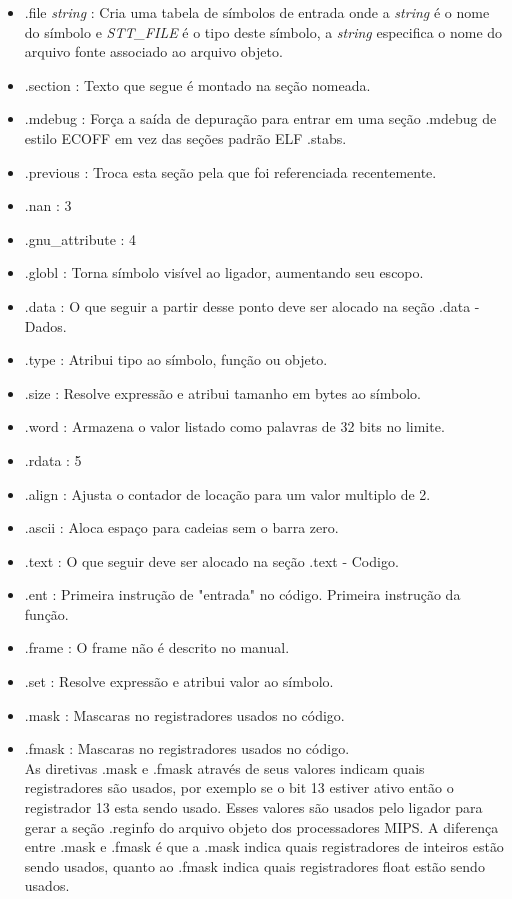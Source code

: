 \documentclass[12pt]{article}
\begin{document}
\begin{itemize}
\item .file \textit{string} : Cria uma tabela de símbolos de entrada onde a \textit{string} é o nome do símbolo e \textit{STT_FILE} é o tipo deste símbolo, a \textit{string} especifica o nome do arquivo fonte associado ao arquivo objeto.
\item .section : Texto que segue é montado na seção nomeada. 
\item .mdebug : Força a saída de depuração para entrar em uma seção .mdebug de estilo ECOFF em vez das seções padrão ELF .stabs.
\item .previous : Troca esta seção pela que foi referenciada recentemente.
\item .nan : 3
\item .gnu\_attribute : 4
\item .globl : Torna símbolo visível ao ligador, aumentando seu escopo.
\item .data : O que seguir a partir desse ponto deve ser alocado na seção .data - Dados. 
\item .type : Atribui tipo ao símbolo, função ou objeto.
\item .size : Resolve expressão e atribui tamanho em bytes ao símbolo.
\item .word : Armazena o valor listado como palavras de 32 bits no limite.
\item .rdata : 5
\item .align : Ajusta o contador de locação para um valor multiplo de 2.
\item .ascii : Aloca espaço para cadeias sem o barra zero.
\item .text : O que seguir deve ser alocado na seção .text - Codigo.
\item .ent : Primeira instrução de "entrada" no código. Primeira instrução da função.
\item .frame : O frame não é descrito no manual.
\item .set : Resolve expressão e atribui valor ao símbolo.
\item .mask : Mascaras no registradores usados no código.
\item .fmask : Mascaras no registradores usados no código.\\

As diretivas .mask e .fmask através de seus valores indicam quais registradores são usados, por exemplo se o bit 13 estiver ativo então o registrador 13 esta sendo usado. Esses valores são usados pelo ligador para gerar a seção .reginfo do arquivo objeto dos processadores MIPS. A diferença entre .mask e .fmask é que a .mask indica quais registradores de inteiros estão sendo usados, quanto ao .fmask indica quais registradores float estão sendo usados.
\end{itemize}
\end{document}
